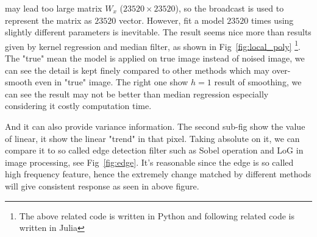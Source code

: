 \documentclass{article}
\begin{document}
may lead too large matrix $W_x$ ($23520 \times 23520$), so the broadcast is used to represent the matrix as 
$23520$ vector. However, fit a model $23520$ times using slightly different parameters is inevitable. 
The result seems nice more than results given by kernel regression and median filter, 
as shown in Fig~\ref{fig:local_poly} \footnote{The above related code is written in Python and following related code is written in Julia}.  
The "true" mean the model is applied on true image instead of noised image,
we can see the detail is kept finely compared to other methods which may over-smooth even in "true" image.
The right one show $h=1$ result of smoothing, we can see the result may not be better than median regression especially considering
it costly computation time. 

And it can also provide variance information. The second sub-fig show the value of linear, it show the linear
"trend" in that pixel. Taking absolute on it, we can compare it to so called edge detection filter such as Sobel operation and LoG
in image processing, see Fig~\ref{fig:edge}. It's reasonable since the edge is so called high frequency feature, hence the extremely
change matched by different methods will give consistent response as seen in above figure.
\end{document}
